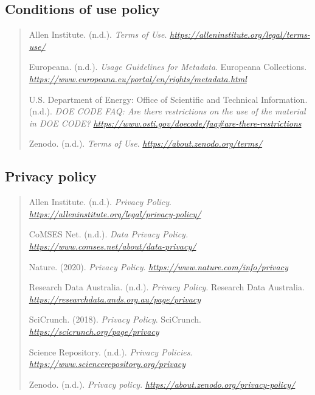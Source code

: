 \documentclass[]{article}
\begin{document}
\subsection{Conditions of use policy}\label{conditions-of-use-policy}

\begin{quote}
Allen Institute. (n.d.). \emph{Terms of Use}.
\href{https://alleninstitute.org/legal/terms-use/}{\emph{https://alleninstitute.org/legal/terms-use/}}

Europeana. (n.d.). \emph{Usage Guidelines for Metadata}. Europeana
Collections.
\href{https://www.europeana.eu/portal/en/rights/metadata.html}{\emph{https://www.europeana.eu/portal/en/rights/metadata.html}}

U.S. Department of Energy: Office of Scientific and Technical
Information. (n.d.). \emph{DOE CODE FAQ: Are there restrictions on the
use of the material in DOE CODE?}
\href{https://www.osti.gov/doecode/faq\#are-there-restrictions}{\emph{https://www.osti.gov/doecode/faq\#are-there-restrictions}}

Zenodo. (n.d.). \emph{Terms of Use}.
\href{https://about.zenodo.org/terms/}{\emph{https://about.zenodo.org/terms/}}
\end{quote}

\subsection{Privacy policy}\label{privacy-policy}

\begin{quote}
Allen Institute. (n.d.). \emph{Privacy Policy}.
\href{https://alleninstitute.org/legal/privacy-policy/}{\emph{https://alleninstitute.org/legal/privacy-policy/}}

CoMSES Net. (n.d.). \emph{Data Privacy Policy.
\url{https://www.comses.net/about/data-privacy/}}

Nature. (2020). \emph{Privacy Policy}.
\href{https://www.nature.com/info/privacy}{\emph{https://www.nature.com/info/privacy}}

Research Data Australia. (n.d.). \emph{Privacy Policy}. Research Data
Australia.
\href{https://researchdata.ands.org.au/page/privacy}{\emph{https://researchdata.ands.org.au/page/privacy}}

SciCrunch. (2018). \emph{Privacy Policy}. SciCrunch.
\href{https://scicrunch.org/page/privacy}{\emph{https://scicrunch.org/page/privacy}}

Science Repository. (n.d.). \emph{Privacy Policies}.
\href{https://www.sciencerepository.org/privacy}{\emph{https://www.sciencerepository.org/privacy}}

Zenodo. (n.d.). \emph{Privacy policy}.
\href{https://about.zenodo.org/privacy-policy/}{\emph{https://about.zenodo.org/privacy-policy/}}
\end{quote}
\end{document}
